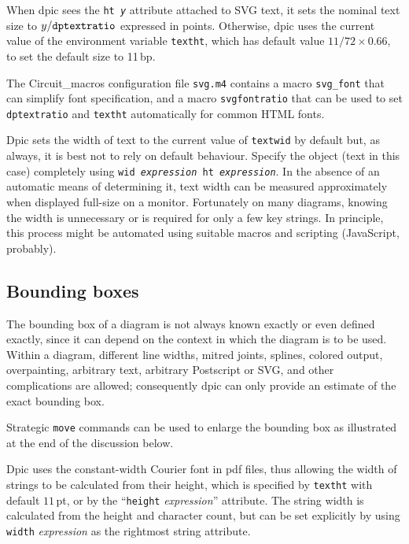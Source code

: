 \documentclass[11pt]{article}
\newcommand{\bq}{}
\newcommand{\Dpic}{{\bq Dpic}\xspace}
\newcommand{\Postscript}{{\bq Postscript}\xspace}
\newcommand{\dpic}{{\bq dpic}\xspace}
\begin{document}
  When \dpic sees the {\tt ht {\it y}} attribute attached to SVG text,
  it sets the nominal text size
  to $y/\tt{dptextratio}$ expressed in points.
  Otherwise, \dpic uses the current value of the environment
  variable {\tt textht}, which has default value $11/72 \times 0.66,$
  to set the default size to 11\,bp.

  The Circuit\_macros configuration file {\tt svg.m4} contains a macro
  {\tt svg\_font} that can simplify font specification, and a macro
  {\tt svgfontratio} that can be used to set {\tt dptextratio} and
  {\tt textht} automatically for common HTML fonts.

  \Dpic sets the width of text
  to the current value of {\tt textwid} by default but,
  as always, it is best not to rely on
  default behaviour. Specify the object (text in this case) completely
  using {\tt wid {\it expression} ht {\it expression}}.
  In the absence of an automatic means of determining it, text width can
  be measured approximately when displayed full-size on a monitor.
  Fortunately on many diagrams, knowing the width is unnecessary or
  is required for only a few key strings.
  In principle, this process might be automated using suitable macros
  and scripting (JavaScript, probably).

\enlargethispage{\baselineskip}
\subsection{Bounding boxes}
  The bounding box of a diagram is not always known exactly or even defined
  exactly, since it can depend on the context in which the diagram is to be
  used.  Within a diagram, different line widths, mitred joints, splines,
  colored output, overpainting, arbitrary text, arbitrary \Postscript or SVG,
  and other complications are allowed; consequently dpic can only provide an
  estimate of the exact bounding box.

  Strategic {\tt move} commands can be used
  to enlarge the bounding box as illustrated at the end of the discussion
  below.

  Dpic uses the constant-width Courier font in pdf files, thus allowing
  the width of strings to be calculated from their height, which is
  specified by {\tt textht} with default $11\,$pt, or by the
  ``{\tt height} {\sl expression}'' attribute.  The string width is calculated
  from the height and character count, but can be set explicitly
  by using {\tt width} {\sl expression} as the rightmost string attribute.
\end{document}
